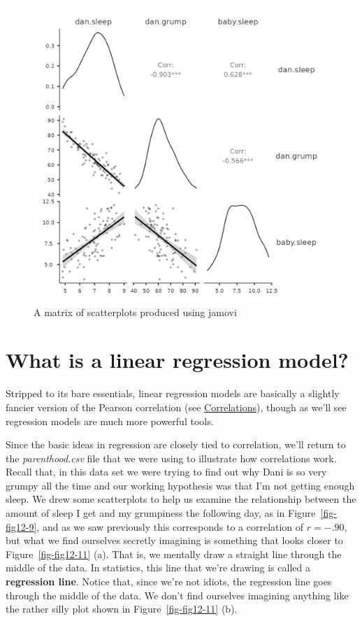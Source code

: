\documentclass[
  a4paper,
]{book}
\begin{document}
\begin{figure}

\includegraphics[width=1\textwidth,height=\textheight]{images/fig12-10.png} \hfill{}

\caption{\label{fig-fig12-10}A matrix of scatterplots produced using
jamovi}

\end{figure}

\hypertarget{what-is-a-linear-regression-model}{%
\section{What is a linear regression
model?}\label{what-is-a-linear-regression-model}}

Stripped to its bare essentials, linear regression models are basically
a slightly fancier version of the Pearson correlation (see
\protect\hyperlink{correlations}{Correlations}), though as we'll see
regression models are much more powerful tools.

Since the basic ideas in regression are closely tied to correlation,
we'll return to the \emph{parenthood.csv} file that we were using to
illustrate how correlations work. Recall that, in this data set we were
trying to find out why Dani is so very grumpy all the time and our
working hypothesis was that I'm not getting enough sleep. We drew some
scatterplots to help us examine the relationship between the amount of
sleep I get and my grumpiness the following day, as in
Figure~\ref{fig-fig12-9}, and as we saw previously this corresponds to a
correlation of \(r = -.90\), but what we find ourselves secretly
imagining is something that looks closer to Figure~\ref{fig-fig12-11}
(a). That is, we mentally draw a straight line through the middle of the
data. In statistics, this line that we're drawing is called a
\textbf{regression line}. Notice that, since we're not idiots, the
regression line goes through the middle of the data. We don't find
ourselves imagining anything like the rather silly plot shown in
Figure~\ref{fig-fig12-11} (b).
\end{document}
